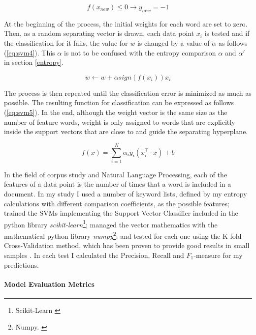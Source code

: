 \documentclass[review]{elsarticle}
\newcommand{\myparagraph}[1]{\paragraph{#1}\mbox{}\smallskip}
\begin{document}
\begin{equation}\label{eq:svm3}
f(x_{new})\leq 0 \rightarrow y_{new} = -1 
\end{equation}

At the beginning of the process, the initial weights for each word are set to zero. Then, as a random separating vector is drawn, each data point \(x_i\) is tested and if the classification for it fails, the value for \(w\) is changed by a value of \(\alpha\) as follows (\ref{eq:svm4}). This \(\alpha\) is not to be confused with the entropy comparison \(\alpha\) and \(\alpha'\) in section \ref{entropy}.

\begin{equation}\label{eq:svm4}
w \leftarrow w + \alpha sign(f(x_i))x_i
\end{equation}

The process is then repeated until the classification error is minimized as much as possible. The resulting function for classification can be expressed as follows (\ref{eq:svm5}). In the end, although the weight vector is the same size as the number of feature words, weight is only assigned to words that are explicitly inside the support vectors that are close to and guide the separating hyperplane.

\begin{equation}\label{eq:svm5}
f(x) = \sum_{i=1}^N \alpha_i y_i (x_i^\top \cdot x) + b
\end{equation}

In the field of corpus study and Natural Language Processing, each of the features of a data point is the number of times that a word is included in a document. In my study I used a number of keyword lists, defined by my entropy calculations with different comparison coefficients, as the possible features; trained the SVMs implementing the Support Vector Classifier included in the python library \textit{scikit-learn}\footnote{\label{scikitlearn}Scikit-Learn \href {http://scikit-learn.org/}{}}; managed the vector mathematics with the mathematical python library \textit{numpy}\footnote{\label{numpy}Numpy. \href {http://numpy.org/}{}}; and tested for each one using the K-fold Cross-Validation method, which has been proven to provide good results in small samples \cite{kohavi1995}. In each test I calculated the Precision, Recall and \(F_1\)-measure \cite{powers2011} for my predictions.

\myparagraph{Model Evaluation Metrics}
\label{model_evaluation}
\end{document}
